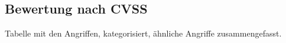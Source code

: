 \subsection{Bewertung nach CVSS}
\label{sec:analysis_cvss}
	Tabelle mit den Angriffen, kategorisiert, ähnliche Angriffe zusammengefasst.